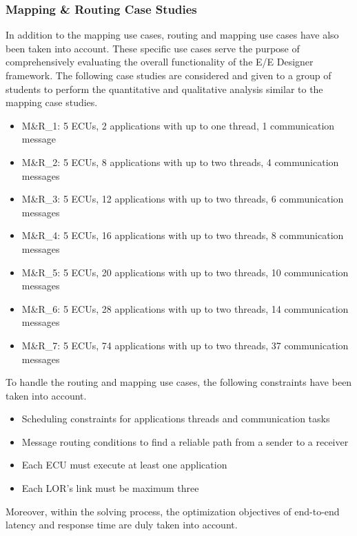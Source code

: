     


    \subsubsection{Mapping \& Routing Case Studies}
    In addition to the mapping use cases, routing and mapping use cases have also been taken into account. These specific use cases serve the purpose of comprehensively evaluating the overall functionality of the E/E Designer framework. The following case studies are considered and given to a group of students to perform the quantitative and qualitative analysis similar to the mapping case studies.
    \begin{itemize}
        \item M\&R\_1: 5 ECUs, 2 applications with up to one thread, 1 communication message
        \item M\&R\_2: 5 ECUs, 8 applications with up to two threads, 4 communication messages
        \item M\&R\_3: 5 ECUs, 12 applications with up to two threads, 6 communication messages
        \item M\&R\_4: 5 ECUs, 16 applications with up to two threads, 8 communication messages
        \item M\&R\_5: 5 ECUs, 20 applications with up to two threads, 10 communication messages
        \item M\&R\_6: 5 ECUs, 28 applications with up to two threads, 14 communication messages
        \item M\&R\_7: 5 ECUs, 74 applications with up to two threads, 37 communication messages
    \end{itemize}

    To handle the routing and mapping use cases, the following constraints have been taken into account.
    \begin{itemize}
        \item Scheduling constraints for applications threads and communication tasks
        \item Message routing conditions to find a reliable path from a sender to a receiver
        \item Each ECU must execute at least one application
        \item Each LOR's link must be maximum three
    \end{itemize}
    Moreover, within the solving process, the optimization objectives of end-to-end latency and response time are duly taken into account.

